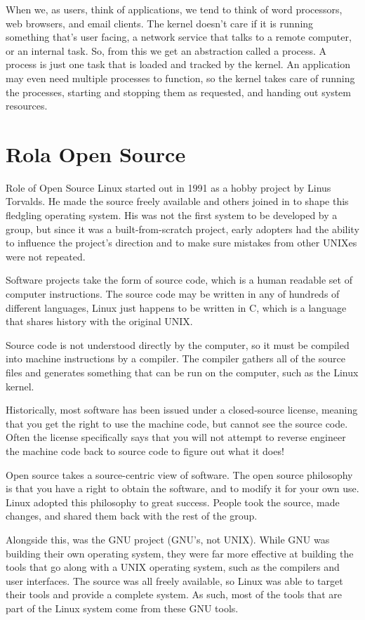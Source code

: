 \documentclass[a4paper,titlepage,12pt]{mwart}
\begin{document}
When we, as users, think of applications, we tend to think of word processors, web browsers, and email clients. The kernel doesn’t care if it is running something that’s user facing, a network service that talks to a remote computer, or an internal task. So, from this we get an abstraction called a process. A process is just one task that is loaded and tracked by the kernel. An application may even need multiple processes to function, so the kernel takes care of running the processes, starting and stopping them as requested, and handing out system resources.
\section{Rola Open Source}
Role of Open Source
Linux started out in 1991 as a hobby project by Linus Torvalds. He made the source freely available and others joined in to shape this fledgling operating system. His was not the first system to be developed by a group, but since it was a built-from-scratch project, early adopters had the ability to influence the project’s direction and to make sure mistakes from other UNIXes were not repeated.

Software projects take the form of source code, which is a human readable set of computer instructions. The source code may be written in any of hundreds of different languages, Linux just happens to be written in C, which is a language that shares history with the original UNIX.

Source code is not understood directly by the computer, so it must be compiled into machine instructions by a compiler. The compiler gathers all of the source files and generates something that can be run on the computer, such as the Linux kernel.

Historically, most software has been issued under a closed-source license, meaning that you get the right to use the machine code, but cannot see the source code. Often the license specifically says that you will not attempt to reverse engineer the machine code back to source code to figure out what it does!

Open source takes a source-centric view of software. The open source philosophy is that you have a right to obtain the software, and to modify it for your own use. Linux adopted this philosophy to great success. People took the source, made changes, and shared them back with the rest of the group.

Alongside this, was the GNU project (GNU’s, not UNIX). While GNU was building their own operating system, they were far more effective at building the tools that go along with a UNIX operating system, such as the compilers and user interfaces. The source was all freely available, so Linux was able to target their tools and provide a complete system. As such, most of the tools that are part of the Linux system come from these GNU tools.
\end{document}
